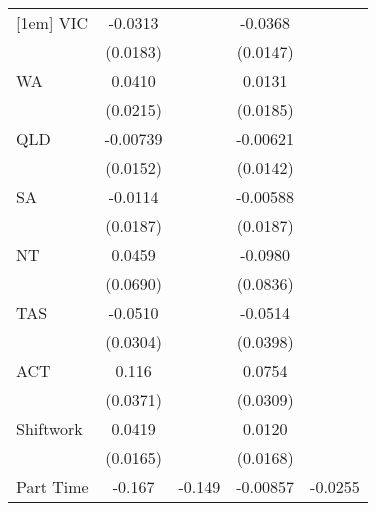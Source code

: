 {\begin{tabular}{l*{4}{c}}
[1em]
VIC                 &     -0.0313         &                     &     -0.0368\sym{*}  &                     \\
                    &    (0.0183)         &                     &    (0.0147)         &                     \\
[1em]
WA                  &      0.0410         &                     &      0.0131         &                     \\
                    &    (0.0215)         &                     &    (0.0185)         &                     \\
[1em]
QLD                 &    -0.00739         &                     &    -0.00621         &                     \\
                    &    (0.0152)         &                     &    (0.0142)         &                     \\
[1em]
SA                  &     -0.0114         &                     &    -0.00588         &                     \\
                    &    (0.0187)         &                     &    (0.0187)         &                     \\
[1em]
NT                  &      0.0459         &                     &     -0.0980         &                     \\
                    &    (0.0690)         &                     &    (0.0836)         &                     \\
[1em]
TAS                 &     -0.0510         &                     &     -0.0514         &                     \\
                    &    (0.0304)         &                     &    (0.0398)         &                     \\
[1em]
ACT                 &       0.116\sym{**} &                     &      0.0754\sym{*}  &                     \\
                    &    (0.0371)         &                     &    (0.0309)         &                     \\
[1em]
Shiftwork           &      0.0419\sym{*}  &                     &      0.0120         &                     \\
                    &    (0.0165)         &                     &    (0.0168)         &                     \\
[1em]
Part Time           &      -0.167\sym{***}&      -0.149\sym{***}&    -0.00857         &     -0.0255\sym{*}  \\

\end{tabular}}
